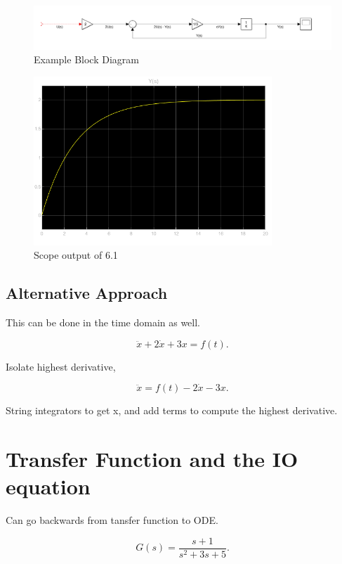 \documentclass[12pt, a4paper]{report}
\begin{document}
  \begin{figure}
    \centering
    \includegraphics[width=\textwidth]{figures/blockdiagram1}
    \caption{Example Block Diagram}
  \end{figure}

  \begin{figure}
    \centering
    \includegraphics[width=0.8\textwidth]{figures/scope1}
    \caption{Scope output of 6.1}
  \end{figure}

  \subsection{Alternative Approach}

  This can be done in the time domain as well.

  \[
      \ddot x + 2\dot x + 3x = f(t)
    .\]

  Isolate highest derivative,

  \[
      \ddot x = f(t) - 2\dot x - 3x
    .\]

  String integrators to get x, and add terms to compute the highest derivative.

  \section{Transfer Function and the IO equation}

  Can go backwards from tansfer function to ODE.

  \[
      G(s) = \frac{s + 1}{s ^2 + 3s + 5}
    .\]
\end{document}
